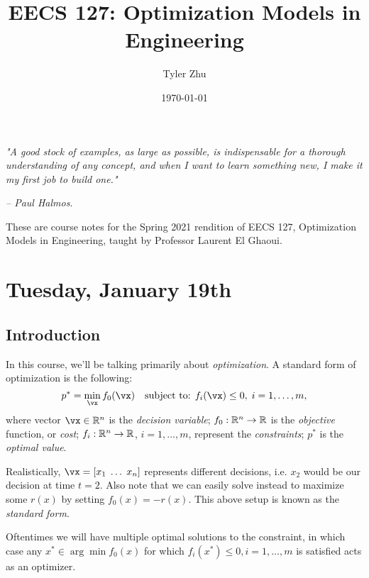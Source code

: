 \documentclass[11 pt]{scrartcl}
\begin{document}
 
\title{\Large EECS 127: Optimization Models in Engineering}
\author{\large Tyler Zhu}
\date{\large\today}

\maketitle 

\begin{center}
\begin{displayquote}
    \emph{"A good stock of examples, as large as possible, is indispensable for a thorough understanding of any concept, and when I want to learn something new, I make it my first job to build one."} \\ \begin{flushright} \emph{– Paul Halmos}.  \end{flushright}
\end{displayquote}
\end{center}


These are course notes for the Spring 2021 rendition of EECS 127, Optimization Models in Engineering, taught by Professor Laurent El Ghaoui.

\tableofcontents 

\newpage

\section{Tuesday, January 19th}
\subsection{Introduction}
In this course, we'll be talking primarily about \emph{optimization}. 
A standard form of optimization is the following: 
\[ p^* = \min_\vx f_0(\vx)\quad \text{subject to: } f_i(\vx) \leq 0,\; i=1,\dots, m,\] 
where 
\itemnum
    \ii vector $\vx\in \RR^n$ is the \emph{decision variable}; 
    \ii $f_0: \mathbb R^n \to \mathbb R$ is the \emph{objective} function, or \emph{cost}; 
    \ii $f_i: \mathbb R^n\to \mathbb R$, $i=1,\dots, m$, represent the \emph{constraints}; 
    \ii $p^*$ is the \emph{optimal value}. 
\itemend

Realistically, $\vx = [x_1\; \dots\; x_n]$ represents different decisions, i.e. $x_2$ would be our decision at time $t=2$. 
Also note that we can easily solve instead to maximize some $r(x)$ by setting $f_0(x) = -r(x)$. 
This above setup is known as the \emph{standard form}. 

Oftentimes we will have multiple optimal solutions to the constraint, in which case any $x^* \in \arg\min f_0(x)$ for which $f_i(x^*) \leq 0, i=1, \dots, m$ is satisfied acts as an optimizer.
\end{document}
